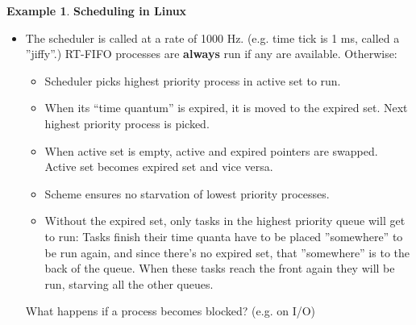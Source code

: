 \documentclass[11pt,a4paper]{article}
\theoremstyle{definition}
\newtheorem{example}{Example}[section]
\newenvironment{myitemize}
{ \begin{itemize}
    \setlength{\itemsep}{5pt}
    \setlength{\parskip}{0pt}
    \setlength{\parsep}{0pt}     }
{ \end{itemize}                  }
\begin{document}
\begin{example}{\textbf{Scheduling in Linux}}
\begin{myitemize}
		\item The scheduler is called at a rate of 1000 Hz. (e.g. time tick is 1 ms, called a ''jiffy''.) \textsf{RT-FIFO} processes are \textbf{always} run if any are available. Otherwise:
		\begin{myitemize}
			\item Scheduler picks highest priority process in active set to run.
			\item When its “time quantum” is expired, it is moved to the expired set. Next highest priority process is picked.
			\item When active set is empty, active and expired pointers are swapped. Active set becomes expired set and vice versa.
			\item Scheme ensures no starvation of lowest priority processes.
			\item Without the expired set, only tasks in the highest priority queue will get to run: Tasks finish their time quanta have to be placed ''somewhere'' to be run again, and since there’s no expired set, that ''somewhere'' is to the back of the queue. When these tasks reach the front again they will be run, starving all the other queues.
		\end{myitemize}
		\begin{tcolorbox}
			\textsf{What happens if a process becomes blocked? (e.g. on I/O)}
			

\end{tcolorbox}
\end{myitemize}
\end{example}
\end{document}
